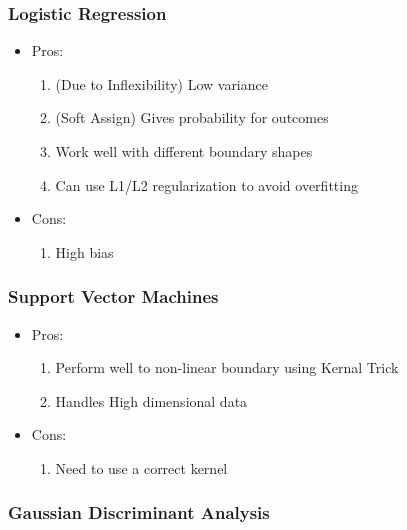 \documentclass[12pt]{amsart}
\numberwithin{equation}{section}
\theoremstyle{plain}
\theoremstyle{definition}
\begin{document}
\subsubsection{Logistic Regression}

\begin{itemize}
\item Pros: 

\begin{enumerate}
\item (Due to Inflexibility) Low variance
\item (Soft Assign) Gives probability for outcomes
\item Work well with different boundary shapes
\item Can use L1/L2 regularization to avoid overfitting
\end{enumerate}

\item Cons:

\begin{enumerate}
\item High bias
\end{enumerate}

\end{itemize}

\subsubsection{Support Vector Machines}

\begin{itemize}
\item Pros: 

\begin{enumerate}
\item Perform well to non-linear boundary using Kernal Trick
\item Handles High dimensional data
\end{enumerate}

\item Cons:

\begin{enumerate}
\item Need to use a correct kernel
\end{enumerate}

\end{itemize}

\subsubsection{Gaussian Discriminant Analysis}
\end{document}
